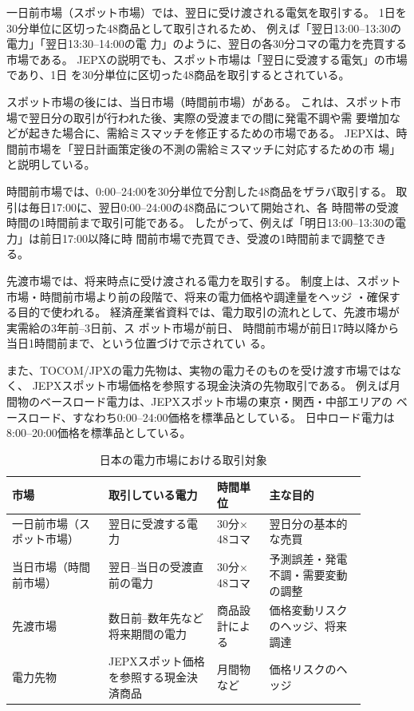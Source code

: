 \documentclass[a4paper,11pt]{ltjsarticle}
\begin{document}
一日前市場（スポット市場）では、翌日に受け渡される電気を取引する。%
1日を30分単位に区切った48商品として取引されるため、
例えば「翌日13:00--13:30の電力」「翌日13:30--14:00の電
力」のように、翌日の各30分コマの電力を売買する市場である。%
JEPXの説明でも、スポット市場は「翌日に受渡する電気」の市場であり、1日
を30分単位に区切った48商品を取引するとされている\cite{jepx}。

スポット市場の後には、当日市場（時間前市場）がある。
これは、スポット市場で翌日分の取引が行われた後、実際の受渡までの間に発電不調や需
要増加などが起きた場合に、需給ミスマッチを修正するための市場である。%
JEPXは、時間前市場を「翌日計画策定後の不測の需給ミスマッチに対応するための市
場」と説明している\cite{jepx}。

時間前市場では、0:00--24:00を30分単位で分割した48商品をザラバ取引する。
取引は毎日17:00に、翌日0:00--24:00の48商品について開始され、各
時間帯の受渡時間の1時間前まで取引可能である\cite{meti}。
したがって、例えば「明日13:00--13:30の電力」は前日17:00以降に時
間前市場で売買でき、受渡の1時間前まで調整できる。

先渡市場では、将来時点に受け渡される電力を取引する。
制度上は、スポット市場・時間前市場より前の段階で、将来の電力価格や調達量をヘッジ
・確保する目的で使われる。
経済産業省資料では、電力取引の流れとして、先渡市場が実需給の3年前--3日前、ス
ポット市場が前日、
時間前市場が前日17時以降から当日1時間前まで、という位置づけで示されてい
る\cite{meti}。

また、TOCOM/JPXの電力先物は、実物の電力そのものを受け渡す市場ではなく、%
JEPXスポット市場価格を参照する現金決済の先物取引である。
例えば月間物のベースロード電力は、JEPXスポット市場の東京・関西・中部エリアの
ベースロード、すなわち0:00--24:00価格を標準品としている。
日中ロード電力は8:00--20:00価格を標準品としている\cite{jpx}。

\begin{table}[htbp]
  \centering
  \caption{日本の電力市場における取引対象}
  \small
  \begin{tabular}{p{0.24\linewidth}p{0.27\linewidth}p{0.13\linewidth}p{0.24\linewidth}}
    \toprule
    市場 & 取引している電力 & 時間単位 & 主な目的 \\
    \midrule
    一日前市場（スポット市場） & 翌日に受渡する電力 & 30分$\times$48コマ & 翌日分の基本的な売買 \\
    当日市場（時間前市場） & 翌日--当日の受渡直前の電力 & 30分$\times$48コマ & 予測誤差・発電不調・需要変動の調整 \\
    先渡市場 & 数日前--数年先など将来期間の電力 & 商品設計による & 価格変動リスクのヘッジ、将来調達 \\
    電力先物 & JEPXスポット価格を参照する現金決済商品 & 月間物など & 価格リスクのヘッジ \\
    \bottomrule
  \end{tabular}
\end{table}
\end{document}
